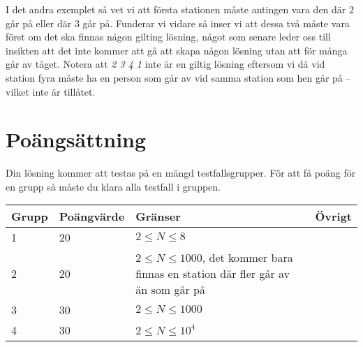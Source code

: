I det andra exemplet så vet vi att första stationen måste antingen vara den där $2$ går på eller där $3$
går på. Funderar vi vidare så inser vi att dessa två måste vara först om det ska finnas någon gilting lösning,
något som senare leder oss till insikten att det inte kommer att gå att skapa någon lösning utan att för många
går av tåget. Notera att \emph{2 3 4 1} inte är en giltig lösning eftersom vi då vid station fyra måste ha en person
som går av vid samma station som hen går på -- vilket inte är tillåtet.

\section*{Poängsättning}
Din lösning kommer att testas på en mängd testfallsgrupper. För att få poäng för en grupp så måste du klara alla testfall i gruppen.

\begin{tabular}{| l | l | l | l |}
\hline
Grupp & Poängvärde & Gränser & Övrigt\\ \hline
1     & 20         & $ 2 \le N \le 8 $ & \\ \hline
2     & 20         & $ 2 \le N \le 1000 $, det kommer bara finnas en station där fler går av än som går på & \\ \hline
3     & 30         & $ 2 \le N \le 1000 $ & \\ \hline
4     & 30         & $ 2 \le N \le 10^4 $ & \\ \hline
\end{tabular}

